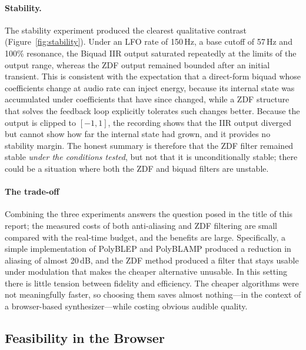 \paragraph{Stability.} The stability experiment produced the clearest qualitative contrast (Figure~\ref{fig:stability}). Under an LFO rate of 150\,Hz, a base cutoff of 57\,Hz and 100\% resonance, the Biquad IIR output saturated repeatedly at the limits of the output range, whereas the ZDF output remained bounded after an initial transient. This is consistent with the expectation that a direct-form biquad whose coefficients change at audio rate can inject energy, because its internal state was accumulated under coefficients that have since changed, while a ZDF structure that solves the feedback loop explicitly tolerates such changes better\cite{va_filter}. Because the output is clipped to $[-1,1]$, the recording shows that the IIR output diverged but cannot show how far the internal state had grown, and it provides no stability margin. The honest summary is therefore that the ZDF filter remained stable \emph{under the conditions tested}, but not that it is unconditionally stable; there could be a situation where both the ZDF and biquad filters are unstable.

\paragraph{The trade-off} Combining the three experiments answers the question posed in the title of this report; the measured costs of both anti-aliasing and ZDF filtering are small compared with the real-time budget, and the benefits are large. Specifically, a simple implementation of PolyBLEP and PolyBLAMP produced a reduction in aliasing of almost 20\,dB, and the ZDF method produced a filter that stays usable under modulation that makes the cheaper alternative unusable. In this setting there is little tension between fidelity and efficiency. The cheaper algorithms were not meaningfully faster, so choosing them saves almost nothing---in the context of a browser-based synthesizer---while costing obvious audible quality.

\subsection{Feasibility in the Browser}

